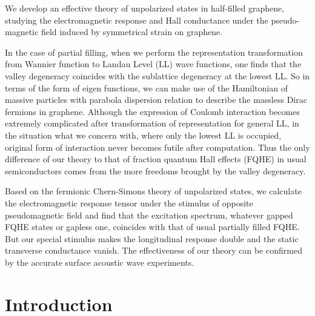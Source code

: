 \documentclass[bachelor,english,numbers]{ustcthesis}
\begin{document}
\begin{enabstract}
	We develop an effective theory of unpolarized states in half-filled graphene, studying the electromagnetic response and Hall conductance under the pseudo-magnetic field induced by symmetrical strain on graphene.\par

	In the case of partial filling, when we perform the representation transformation from Wannier function to Landau Level (LL) wave functions, one finds that the valley degeneracy coincides with the sublattice degeneracy at the lowest LL. So in terms of the form of eigen functions, we can make use of the Hamiltonian of massive particles with parabola dispersion relation to describe the massless Dirac fermions in graphene. Although the expression of Coulomb interaction becomes extremely complicated after transformation of representation for general LL, in the situation what we concern with, where only the lowest LL is occupied, original form of interaction never becomes futile after computation. Thus the only difference of our theory to that of fraction quantum Hall effects (FQHE) in usual semiconductors comes from the more freedoms brought by the valley degeneracy.\par

	Based on the fermionic Chern-Simons theory of unpolarized states, we calculate the electromagnetic response tensor under the stimulus of opposite pseudomagnetic field and find that the excitation spectrum, whatever gapped FQHE states or gapless one, coincides with that of usual partially filled FQHE. But our special stimulus makes the longitudinal response double and the static transverse conductance vanish. The effectiveness of our theory can be confirmed by the accurate surface acoustic wave experiments.  

\end{enabstract}


\mainmatter

\chapter{Introduction}
\end{document}
